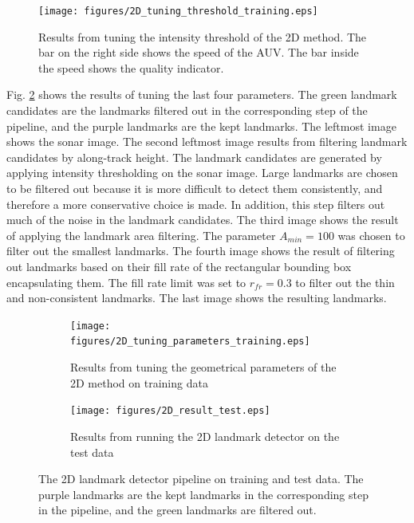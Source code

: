 \begin{figure}  %
  \centering
  \texttt{[image: figures/2D\_tuning\_threshold\_training.eps]}
  \caption[Results of tuning intensity threshold the 2D method]{Results from tuning the intensity threshold of the 2D method. The bar on the right side shows the speed of the AUV. The bar inside the speed shows the quality indicator. }
  \label{fig:2D_tuning_intensity_thres}
\end{figure}

Fig. \ref{fig:2d_tuning_paramaters_training} shows the results of tuning the last four parameters. The green landmark candidates are the landmarks filtered out in the corresponding step of the pipeline, and the purple landmarks are the kept landmarks. The leftmost image shows the sonar image. The second leftmost image results from filtering landmark candidates by along-track height. The landmark candidates are generated by applying intensity thresholding on the sonar image. Large landmarks are chosen to be filtered out because it is more difficult to detect them consistently, and therefore a more conservative choice is made. In addition, this step filters out much of the noise in the landmark candidates. The third image shows the result of applying the landmark area filtering. The parameter $A_{min} = 100$ was chosen to filter out the smallest landmarks. The fourth image shows the result of filtering out landmarks based on their fill rate of the rectangular bounding box encapsulating them. The fill rate limit was set to $r_{fr} = 0.3$ to filter out the thin and non-consistent landmarks. The last image shows the resulting landmarks.

\newpage

\begin{figure} [h!] %
     \centering
     \begin{subfigure}[bh]{0.59\textwidth}
         \centering
         \texttt{[image: figures/2D\_tuning\_parameters\_training.eps]}
         \caption[Results of tuning the geometrical thresholds 2D method]{Results from tuning the geometrical parameters of the 2D method on training data}
         \label{fig:2d_tuning_paramaters_training}
     \end{subfigure}
     \hfill
     \begin{subfigure}[bh]{0.395\textwidth}
         \centering
         \texttt{[image: figures/2D\_result\_test.eps]}
         \caption[Results from testing the 2D landmark detector]{Results from running the 2D landmark detector on the test data}
         \label{fig:2d_result_test}
     \end{subfigure}
     \caption{The 2D landmark detector pipeline on training and test data. The purple landmarks are the kept landmarks in the corresponding step in the pipeline, and the green landmarks are filtered out.}
\end{figure}

